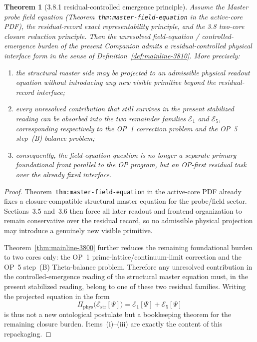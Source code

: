 \documentclass[12pt,a4paper]{article}
\newtheorem{theorem}{Theorem}[section]
\begin{document}
\begin{theorem}[3.8.1 residual-controlled emergence principle]
\label{thm:mainline-3810}
Assume the Master probe field equation (Theorem~\texttt{thm:master-field-equation} in the active-core PDF), the residual-record exact representability principle, and the 3.8 two-core closure reduction principle. Then the unresolved field-equation / controlled-emergence burden of the present Companion admits a residual-controlled physical interface form in the sense of Definition~\ref{def:mainline-3810}. More precisely:
\begin{enumerate}[label=(\roman*), leftmargin=2em]
 \item the structural master side may be projected to an admissible physical readout equation without introducing any new visible primitive beyond the residual-record interface;
 \item every unresolved contribution that still survives in the present stabilized reading can be absorbed into the two remainder families \(\mathcal E_{1}\) and \(\mathcal E_{5}\), corresponding respectively to the OP~1 correction problem and the OP~5 step~(B) balance problem;
 \item consequently, the field-equation question is no longer a separate primary foundational front parallel to the OP program, but an OP-first residual task over the already fixed interface.
\end{enumerate}
\end{theorem}

\begin{proof}
Theorem~\texttt{thm:master-field-equation} in the active-core PDF already fixes a closure-compatible structural master equation for the probe/field sector. Sections~3.5 and~3.6 then force all later readout and frontend organization to remain conservative over the residual record, so no admissible physical projection may introduce a genuinely new visible primitive.

Theorem~\ref{thm:mainline-3800} further reduces the remaining foundational burden to two cores only: the OP~1 prime-lattice/continuum-limit correction and the OP~5 step~(B) Theta-balance problem. Therefore any unresolved contribution in the controlled-emergence reading of the structural master equation must, in the present stabilized reading, belong to one of these two residual families. Writing the projected equation in the form
\[
 \Pi_{\mathrm{phys}}\bigl(\mathcal E_{\mathrm{str}}[\Psi]\bigr)
 =
 \mathcal E_{1}[\Psi]+\mathcal E_{5}[\Psi]
\]
is thus not a new ontological postulate but a bookkeeping theorem for the remaining closure burden. Items~(i)--(iii) are exactly the content of this repackaging.
\end{proof}
\end{document}
